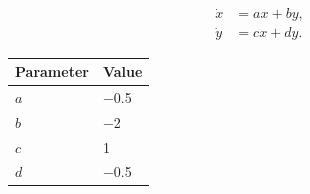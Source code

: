 \begin{align}
  \dot{x} &= ax+by, \label{eq:linear-system-x} \\
  \dot{y} &= cx+dy. \label{eq:linear-system-y}
\end{align}
\begin{center}
\begin{tabular}{@{}ll@{}}
\toprule
Parameter & Value \\
\midrule
$a$ & \num{-0.5} \\
$b$ & \num{-2} \\
$c$ & \num{1} \\
$d$ & \num{-0.5} \\
\bottomrule
\end{tabular}
\end{center}
